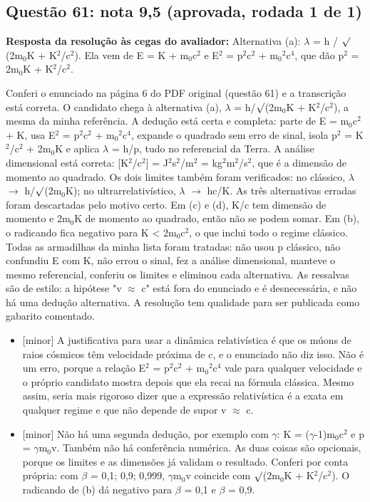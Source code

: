 \documentclass{article}%
\begin{document}
\subsection*{Questão 61: nota 9,5 (aprovada, rodada 1 de 1)}%
\textbf{Resposta da resolução às cegas do avaliador:} Alternativa (a): $\lambda$ = h / $\surd$(2m$_{0}$K + K$^2$/c$^2$). Ela vem de E = K + m$_{0}$c$^2$ e E$^2$ = p$^2$c$^2$ + m$_{0}$$^2$c$^{4}$, que dão p$^2$ = 2m$_{0}$K + K$^2$/c$^2$.\par %
Conferi o enunciado na página 6 do PDF original (questão 61) e a transcrição está correta. O candidato chega à alternativa (a), $\lambda$ = h/$\surd$(2m$_{0}$K + K$^2$/c$^2$), a mesma da minha referência. A dedução está certa e completa: parte de E = m$_{0}$c$^2$ + K, usa E$^2$ = p$^2$c$^2$ + m$_{0}$$^2$c$^{4}$, expande o quadrado sem erro de sinal, isola p$^2$ = K$^2$/c$^2$ + 2m$_{0}$K e aplica $\lambda$ = h/p, tudo no referencial da Terra. A análise dimensional está correta: {[}K$^2$/c$^2${]} = J$^2$s$^2$/m$^2$ = kg$^2$m$^2$/s$^2$, que é a dimensão de momento ao quadrado. Os dois limites também foram verificados: no clássico, $\lambda$ $\to$ h/$\surd$(2m$_{0}$K); no ultrarrelativístico, $\lambda$ $\to$ hc/K. As três alternativas erradas foram descartadas pelo motivo certo. Em (c) e (d), K/c tem dimensão de momento e 2m$_{0}$K de momento ao quadrado, então não se podem somar. Em (b), o radicando fica negativo para K < 2m$_{0}$c$^2$, o que inclui todo o regime clássico. Todas as armadilhas da minha lista foram tratadas: não usou p clássico, não confundiu E com K, não errou o sinal, fez a análise dimensional, manteve o mesmo referencial, conferiu os limites e eliminou cada alternativa. As ressalvas são de estilo: a hipótese "v $\approx$ c" está fora do enunciado e é desnecessária, e não há uma dedução alternativa. A resolução tem qualidade para ser publicada como gabarito comentado.%
\begin{itemize}%
\item%
{[}minor{]} A justificativa para usar a dinâmica relativística é que os múons de raios cósmicos têm velocidade próxima de c, e o enunciado não diz isso. Não é um erro, porque a relação E$^2$ = p$^2$c$^2$ + m$_{0}$$^2$c$^{4}$ vale para qualquer velocidade e o próprio candidato mostra depois que ela recai na fórmula clássica. Mesmo assim, seria mais rigoroso dizer que a expressão relativística é a exata em qualquer regime e que não depende de supor v $\approx$ c.%
\item%
{[}minor{]} Não há uma segunda dedução, por exemplo com $\gamma$: K = ($\gamma$-1)m$_{0}$c$^2$ e p = $\gamma$m$_{0}$v. Também não há conferência numérica. As duas coisas são opcionais, porque os limites e as dimensões já validam o resultado. Conferi por conta própria: com $\beta$ = 0,1; 0,9; 0,999, $\gamma$m$_{0}$v coincide com $\surd$(2m$_{0}$K + K$^2$/c$^2$). O radicando de (b) dá negativo para $\beta$ = 0,1 e $\beta$ = 0,9.%
\end{itemize}%
\end{document}
